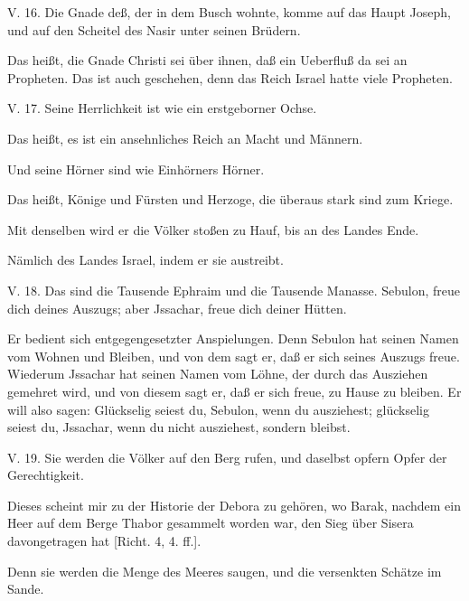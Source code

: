 \begin{schriftzitat}
V. 16. Die Gnade deß, der in dem Busch wohnte, komme auf das Haupt Joseph, und auf den Scheitel des Nasir unter seinen Brüdern.
\end{schriftzitat}

Das heißt, die Gnade Christi sei über ihnen, daß ein Ueberfluß da sei an Propheten. Das ist auch geschehen, denn das Reich Israel hatte viele Propheten.

\begin{schriftzitat}
V. 17. Seine Herrlichkeit ist wie ein erstgeborner Ochse.
\end{schriftzitat}

Das heißt, es ist ein ansehnliches Reich an Macht und Männern.

Und seine Hörner sind wie Einhörners Hörner.

Das heißt, Könige und Fürsten und Herzoge, die überaus stark sind zum Kriege.

Mit denselben wird er die Völker stoßen zu Hauf, bis an des Landes Ende.

Nämlich des Landes Israel, indem er sie austreibt.

\begin{schriftzitat}
V. 18. Das sind die Tausende Ephraim und die Tausende Manasse. Sebulon, freue dich deines Auszugs; aber Jssachar, freue dich deiner Hütten.
\end{schriftzitat}

Er bedient sich entgegengesetzter Anspielungen. Denn Sebulon hat seinen Namen vom Wohnen und Bleiben, und von dem sagt er, daß er sich seines Auszugs freue. Wiederum Jssachar hat seinen Namen vom Löhne, der durch das Ausziehen gemehret wird, und von diesem sagt er, daß er sich freue, zu Hause zu bleiben. Er will also sagen: Glückselig seiest du, Sebulon, wenn du ausziehest; glückselig seiest du, Jssachar, wenn du nicht ausziehest, sondern bleibst.

\begin{schriftzitat}
V. 19. Sie werden die Völker auf den Berg rufen, und daselbst opfern Opfer der Gerechtigkeit.
\end{schriftzitat}

Dieses scheint mir zu der Historie der Debora zu gehören, wo Barak, nachdem ein Heer auf dem Berge Thabor gesammelt worden war, den Sieg über Sisera davongetragen hat [Richt. 4, 4. ff.].

Denn sie werden die Menge des Meeres saugen, und die versenkten Schätze im Sande.

